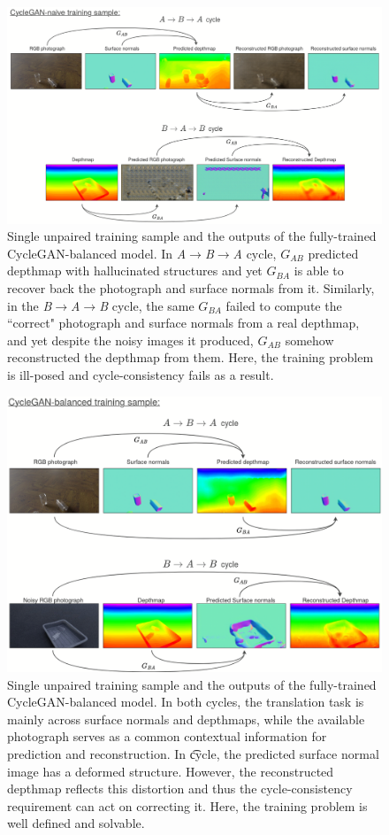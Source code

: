\begin{figure}[h!]
    \centering
    \includegraphics[width=\linewidth]{figures/Expt_1/cyclegan_naive_cycles.png}
    \caption{Single unpaired training sample and the outputs of the fully-trained CycleGAN-balanced model. In \textit{A}$\rightarrow$\textit{B}$\rightarrow$\textit{A} cycle, $G_{AB}$ predicted depthmap with hallucinated structures and yet $G_{BA}$ is able to recover back the photograph and surface normals from it. Similarly, in the \textit{B}$\rightarrow$\textit{A}$\rightarrow$\textit{B} cycle, the same $G_{BA}$ failed to compute the ``correct" photograph and surface normals from a real depthmap, and yet despite the noisy images it produced, $G_{AB}$ somehow reconstructed the depthmap from them. Here, the training problem is ill-posed and cycle-consistency fails as a result.}
    \label{fig:cleargrasp_cyclegan_naive_cycles}
\end{figure}

\begin{figure}[h!]
    \centering
    \includegraphics[width=0.8\linewidth]{figures/Expt_1/cyclegan_balanced_cycles.png}
    \caption{Single unpaired training sample and the outputs of the fully-trained CycleGAN-balanced model. In both cycles, the translation task is mainly across surface normals and depthmaps, while the available photograph serves as a common contextual information for prediction and reconstruction. In \t cycle, the predicted surface normal image has a deformed structure. However, the reconstructed depthmap reflects this distortion and thus the cycle-consistency requirement can act on correcting it. Here, the training problem is well defined and solvable.}
    \label{fig:cleargrasp_cyclegan_balanced_cycles}
\end{figure}

